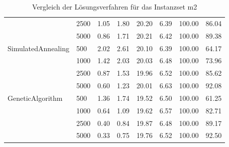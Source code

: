\begin{table}[H]
{\begin{tabular}{ll|rr|rr|rr}
                 & 2500 &     1.05 & 1.80 &      20.20 & 6.39 &   100.00 &   86.04 \\
                 & 5000 &     0.86 & 1.71 &      20.21 & 6.42 &   100.00 &   89.38 \\ \hline
SimulatedAnnealing & 500  &     2.02 & 2.61 &      20.10 & 6.39 &   100.00 &   64.17 \\
                 & 1000 &     1.42 & 2.03 &      20.03 & 6.48 &   100.00 &   73.96 \\
                 & 2500 &     0.87 & 1.53 &      19.96 & 6.52 &   100.00 &   85.62 \\
                 & 5000 &     0.60 & 1.23 &      20.01 & 6.63 &   100.00 &   92.08 \\ \hline
GeneticAlgorithm & 500  &     1.36 & 1.74 &      19.52 & 6.50 &   100.00 &   61.25 \\
                 & 1000 &     0.64 & 1.09 &      19.62 & 6.57 &   100.00 &   82.71 \\
                 & 2500 &     0.40 & 0.84 &      19.87 & 6.48 &   100.00 &   89.17 \\
                 & 5000 &     0.33 & 0.75 &      19.76 & 6.52 &   100.00 &   92.50 \\
\bottomrule
\end{tabular}
}
\caption{Vergleich der Lösungsverfahren für das Instanzset m2}
\label{tab:evaluation_solver_m2}
\end{table}


